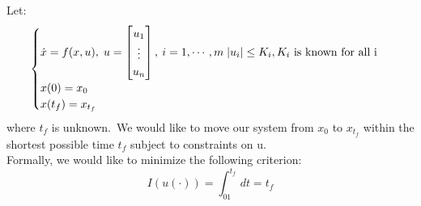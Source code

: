 {
    Let:
    \begin{equation}
        \begin{cases}
        \dot{x} = f(x,u),\; u = \begin{bmatrix}
            u_1  \\
            \vdots\\
            u_n
        \end{bmatrix},\:i=1,\cdots ,m\; \lvert u_i\rvert \le K_i, \text{$K_i$ is known for all i}\\
        x(0) = x_0\\
        x(t_f) = x_{t_f}
            
        \end{cases}
    \end{equation}
    where $t_f$ is unknown.\
    We would like to move our system from  $x_0$ to $x_{t_f}$ within the shortest possible time $t_f$ subject to constraints on u.\\
    Formally, we would like to minimize the following criterion:
    \begin{equation}
        I(u(\cdot)) = \int^{t_f}_01dt = t_f
    \end{equation}
}

